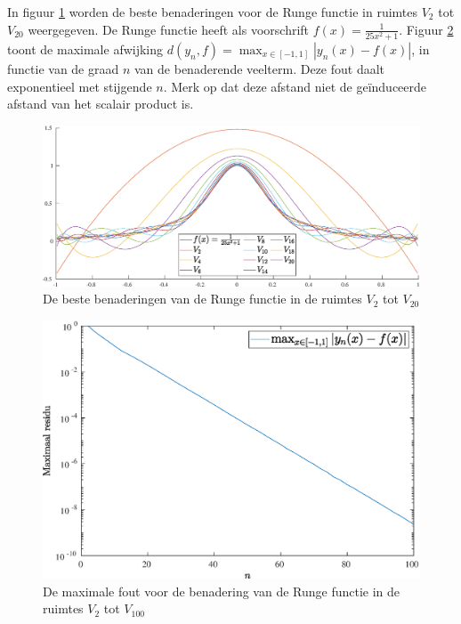 \documentclass[a4paper, 12pt, titlepage, fleqn]{article}
\begin{document}
In figuur \ref{fig:rungeFunctie} worden de beste benaderingen voor de Runge functie in ruimtes $V_2$ tot $V_{20}$ weergegeven. De Runge functie heeft als voorschrift $f(x) = \frac{1}{25x^2+1}$. Figuur \ref{fig:rungeFoutBenadering} toont de maximale afwijking $d(y_n,f) = \max_{x \in [-1,1]}|y_n(x)-f(x)|$, in functie van de graad $n$ van de benaderende veelterm.  Deze fout daalt exponentieel met stijgende $n$. Merk op dat deze afstand niet de ge\"induceerde afstand van het scalair product is.
\begin{figure}[h]
\centering
\includegraphics[scale=0.4]{../Afbeeldingen/rungeBenadering.eps}
\caption{De beste benaderingen van de Runge functie in de ruimtes $V_2$ tot $V_{20}$
\label{fig:rungeFunctie}}
\end{figure}

\begin{figure}
\centering
\includegraphics[scale=0.4]{../Afbeeldingen/rungeFout.eps}
\caption[Maximale fout voor benadering van de Runge functie]{De maximale fout voor de benadering van de Runge functie in de ruimtes $V_2$ tot $V_{100}$
\label{fig:rungeFoutBenadering}}
\end{figure}
\end{document}
